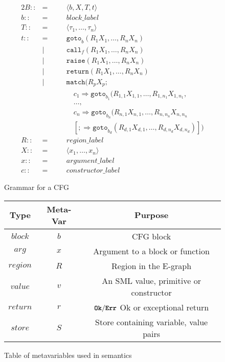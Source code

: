 \documentclass{article}
\newcommand{\bttt}[1]{\texttt{\textbf{#1}}}
\begin{document}
\begin{figure}[H]
  \centering
  \begin{alignat*}{2}
    B ::&=\quad&& \langle b, X, T, t \rangle \\
    b ::&=&& block\_label \\
    T ::&=&& \langle \tau_1, \dots, \tau_n \rangle \\
    t ::&=&& \texttt{goto}_b ( R_1 X_1, \dots, R_n X_n ) \\
        &|&& \texttt{call}_f ( R_1 X_1, \dots, R_n X_n ) \\
        &|&& \texttt{raise} ( R_1 X_1, \dots, R_n X_n ) \\
        &|&& \texttt{return} ( R_1 X_1, \dots, R_n X_n ) \\
        &|&& \texttt{match} ( R_p X_p; \\
        &&&\quad c_1 \Rightarrow \texttt{goto}_{b_1} (R_{1,1} X_{1,1}, \dots, R_{1,n_1} X_{1,n_1},\\
        &&&\quad \dots, \\
        &&&\quad c_n \Rightarrow \texttt{goto}_{b_n} (R_{n,1} X_{n,1}, \dots, R_{n,n_n} X_{n,n_n} \\
        &&&\quad [;\Rightarrow \texttt{goto}_{b_{d}} (R_{d,1} X_{d,1}, \dots, R_{d,n_d} X_{d,n_d})] ) \\
    R ::&=&& region\_label \\
    X ::&=&& \langle x_1, \dots, x_n \rangle \\
    x ::&=&& argument\_label \\
    c ::&=&& constructor\_label
  \end{alignat*}
  \caption{Grammar for a CFG}
  \label{fig:CFG_grammar}
\end{figure}

\begin{figure}[H]
  \centering
  \begin{tabular}{c|c|c}
    \textbf{Type} & \textbf{Meta-Var} & \textbf{Purpose} \\\hline
    $block$       & $b$               & CFG block \\\hline
    $arg$         & $x$               & Argument to a block or function \\\hline
    $region$      & $R$               & Region in the E-graph \\\hline
    $value$       & $v$               & An SML value, primitive or constructor \\\hline
    $return$      & $r$               & $\bttt{Ok}/\bttt{Err}$ Ok or exceptional return\\\hline
    $store$       & $S$               & Store containing variable, value pairs
  \end{tabular}
  \caption{Table of metavariables used in semantics}
  \label{fig:metavars}
\end{figure}
\end{document}
